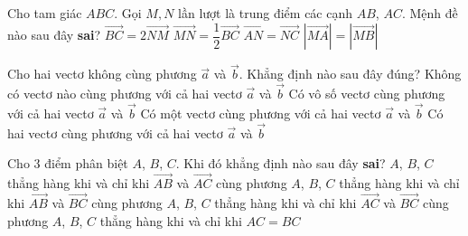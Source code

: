 \begin{ex}%
	Cho tam giác $ABC$. Gọi $M,N$ lần lượt là trung điểm các cạnh $AB$, $AC$. Mệnh đề nào sau đây \textbf{sai}?
	\choice
	{\True $\overrightarrow{BC}=2\overrightarrow{NM}$}
	{$\overrightarrow{MN}=\dfrac{1}{2}\overrightarrow{BC}$}
	{$\overrightarrow{AN}=\overrightarrow{NC}$}
	{$\left|\overrightarrow{MA}\right|=\left|\overrightarrow{MB}\right|$}
\end{ex}


\begin{ex}%
	Cho hai vectơ không cùng phương $\overrightarrow{a}$ và $\overrightarrow{b}$. Khẳng định nào sau đây đúng?
	\choice
	{Không có vectơ nào cùng phương với cả hai vectơ $\overrightarrow{a}$ và $\overrightarrow{b}$}
	{Có vô số vectơ cùng phương với cả hai vectơ $\overrightarrow{a}$ và $\overrightarrow{b}$}
	{\True Có một vectơ cùng phương với cả hai vectơ $\overrightarrow{a}$ và $\overrightarrow{b}$}
	{Có hai vectơ cùng phương với cả hai vectơ $\overrightarrow{a}$ và $\overrightarrow{b}$}
\end{ex}

\begin{ex}%
	Cho $3$ điểm phân biệt $A$, $B$, $C$. Khi đó khẳng định nào sau đây {\bf sai}?
	\choice
	{$A$, $B$, $C$ thẳng hàng khi và chỉ khi $\overrightarrow{AB}$ và $\overrightarrow{AC}$ cùng phương}
	{$A$, $B$, $C$ thẳng hàng khi và chỉ khi $\overrightarrow{AB}$ và $\overrightarrow{BC}$ cùng phương}
	{$A$, $B$, $C$ thẳng hàng khi và chỉ khi $\overrightarrow{AC}$ và $\overrightarrow{BC}$ cùng phương}
	{\True $A$, $B$, $C$ thẳng hàng khi và chỉ khi $AC=BC$}
\end{ex}


